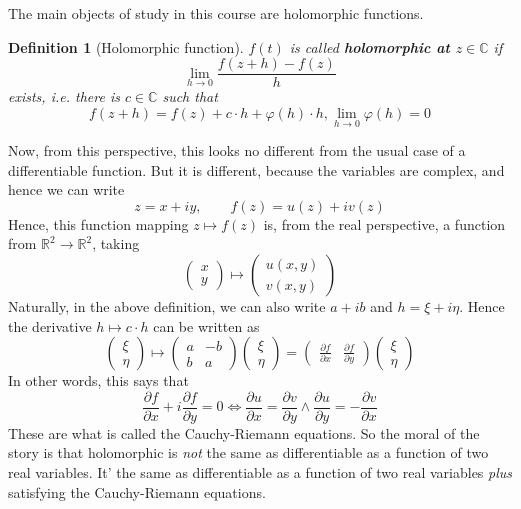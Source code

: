 \documentclass{article}
\newcommand{\mbb}[1]{\mathbb{#1}}
\newcommand{\prt}[2]{{\frac{\partial {#1}}{\partial {#2}}}}
\newcommand{\reals}{\mbb{R}}
\newtheorem{definition}{Definition}
\begin{document}
The main objects of study in this course are holomorphic functions.
\begin{definition}[Holomorphic function]
\(f(t)\) is called \textbf{holomorphic at \(z \in \mbb{C}\)} if
\begin{equation}\lim_{h \to 0}\frac{f(z + h) - f(z)}{h}\end{equation}
exists, i.e. there is \(c \in \mbb{C}\) such that
\begin{equation}f(z + h) = f(z) + c \cdot h + \varphi(h) \cdot h, \lim_{h \to 0}\varphi(h) = 0\end{equation}
\end{definition}
Now, from this perspective, this looks no different from the usual case of a differentiable function. But it is different, because the variables are complex, and hence we can write
\begin{equation}z = x + iy, \qquad f(z) = u(z) + iv(z)\end{equation}
Hence, this function mapping \(z \mapsto f(z)\) is, from the real perspective, a function from
\(\reals^2 \to \reals^2\), taking
\begin{equation}\begin{pmatrix} x \\ y \end{pmatrix} \mapsto \begin{pmatrix} u(x, y) \\ v(x, y) \end{pmatrix}\end{equation}
Naturally, in the above definition, we can also write \(a + ib\) and \(h = \xi + i\eta\). Hence the derivative \(h \mapsto c \cdot h\) can be written as
\begin{equation}\begin{pmatrix} \xi \\ \eta \end{pmatrix} \mapsto
\begin{pmatrix} a & -b \\ b & a \end{pmatrix}
  \begin{pmatrix} \xi \\ \eta \end{pmatrix}
= \begin{pmatrix}\prt{f}{x} & \prt{f}{y}\end{pmatrix}
  \begin{pmatrix} \xi \\ \eta \end{pmatrix}\end{equation}
In other words, this says that
\begin{equation}\prt{f}{x} + i\prt{f}{y} = 0
\iff \prt{u}{x} = \prt{v}{y} \land \prt{u}{y} = -\prt{v}{x}\end{equation}
These are what is called the Cauchy-Riemann equations. So the moral of the story is that holomorphic is \textit{not} the same as differentiable as a function of two real variables. It' the same as differentiable as a function of two real variables \textit{plus} satisfying the Cauchy-Riemann equations.
\end{document}
